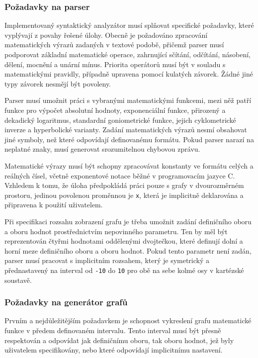 \documentclass[12pt]{article} %
\begin{document}
\subsubsection{Požadavky na parser}

Implementovaný syntaktický analyzátor musí splňovat specifické požadavky, které vyplývají z povahy řešené úlohy. Obecně je požadováno zpracování matematických výrazů zadaných v textové podobě, přičemž parser musí podporovat základní matematické operace, zahrnující sčítání, odčítání, násobení, dělení, mocnění a unární mínus. Priorita operátorů musí být v souladu s matematickými pravidly, případně upravena pomocí kulatých závorek. Žádné jiné typy závorek nesmějí být povoleny.

Parser musí umožnit práci s vybranými matematickými funkcemi, mezi něž patří funkce pro výpočet absolutní hodnoty, exponenciální funkce, přirozený a dekadický logaritmus, standardní goniometrické funkce, jejich cyklometrické inverze a hyperbolické varianty. Zadání matematických výrazů nesmí obsahovat jiné symboly, než které odpovídají definovanému formátu. Pokud parser narazí na neplatné znaky, musí generovat srozumitelnou chybovou zprávu.

Matematické výrazy musí být schopny zpracovávat konstanty ve formátu celých a reálných čísel, včetně exponentové notace běžné v programovacím jazyce C. Vzhledem k tomu, že úloha předpokládá práci pouze s grafy v dvourozměrném prostoru, jedinou povolenou proměnnou je \texttt{x}, která je implicitně deklarována a připravena k použití uživatelem.

Při specifikaci rozsahu zobrazení grafu je třeba umožnit zadání definičního oboru a oboru hodnot prostřednictvím nepovinného parametru. Ten by měl být reprezentován čtyřmi hodnotami oddělenými dvojtečkou, které definují dolní a horní meze definičního oboru a oboru hodnot. Pokud tento parametr není zadán, parser musí pracovat s implicitním rozsahem, který je symetrický a přednastavený na interval od \texttt{-10} do \texttt{10} pro obě na sebe kolmé osy v kartézské soustavě.

\subsubsection{Požadavky na generátor grafů}

Prvním a nejdůležitějším požadavkem je schopnost vykreslení grafu matematické funkce v předem definovaném intervalu. Tento interval musí být přesně respektován a odpovídat jak definičnímu oboru, tak oboru hodnot, jež byly uživatelem specifikovány, nebo které odpovídají implicitnímu nastavení.
\end{document}
